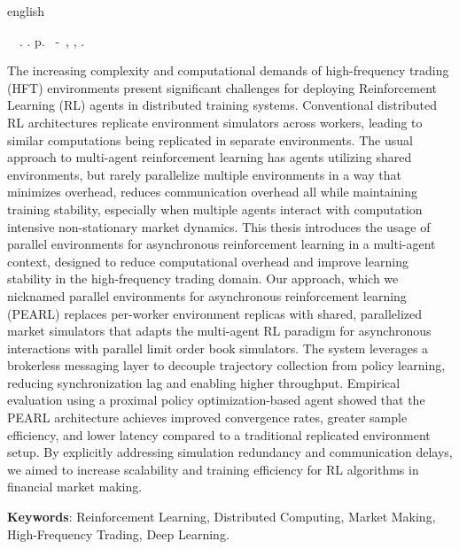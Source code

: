 \begin{resumo}[Abstract]
 \begin{otherlanguage*}{english}
	\begin{flushleft} 
		\setlength{\absparsep}{0pt} %
 		\SingleSpacing  		\imprimirautorabr~~\textbf{\imprimirtitleabstract}.	\imprimirdata.  \pageref{LastPage} p. 
		\imprimirtipotrabalhoabs~-~\imprimirinstituicao, \imprimirlocal, 	\imprimirdata. 
 	\end{flushleft}
	\OnehalfSpacing
    The increasing complexity and computational demands of high-frequency trading (HFT) environments present significant challenges for
    deploying Reinforcement Learning (RL) agents in distributed training systems.
    Conventional distributed RL architectures replicate environment simulators across workers,
    leading to similar computations being replicated in separate environments.
    The usual approach to multi-agent reinforcement learning has agents utilizing shared environments,
    but rarely parallelize multiple environments in a way that minimizes overhead, reduces communication overhead all while maintaining training stability,
    especially when multiple agents interact with computation intensive non-stationary market dynamics.
    This thesis introduces the usage of parallel environments for asynchronous reinforcement learning in a multi-agent context,
    designed to reduce computational overhead and improve learning stability in the high-frequency trading domain.
    Our approach, which we nicknamed parallel environments for asynchronous reinforcement learning (PEARL) replaces per-worker environment replicas with shared,
    parallelized market simulators that adapts the multi-agent RL paradigm for asynchronous interactions with parallel limit order book simulators.
    The system leverages a brokerless messaging layer to decouple trajectory collection from policy learning,
    reducing synchronization lag and enabling higher throughput.
    Empirical evaluation using a proximal policy optimization-based agent showed that the PEARL architecture achieves improved convergence rates, greater sample efficiency,
    and lower latency compared to a traditional replicated environment setup.
    By explicitly addressing simulation redundancy and communication delays,
    we aimed to increase scalability and training efficiency for RL algorithms in financial market making.

   \vspace{\onelineskip}
 
   \noindent 
   \textbf{Keywords}: Reinforcement Learning, Distributed Computing, Market Making, High-Frequency Trading, Deep Learning.
 \end{otherlanguage*}
\end{resumo}

